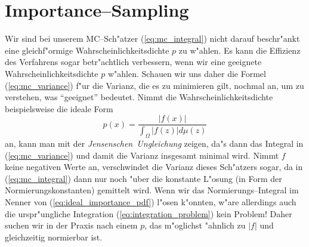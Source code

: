 	\section{Importance--Sampling}\label{subsec:importancesampling}
	Wir sind bei unserem MC--Sch"atzer (\ref{eq:mc_integral}) nicht darauf beschr"ankt eine gleich\-f"or\-mi\-ge Wahrscheinlichkeitsdichte $p$ zu w"ahlen. Es kann die Effizienz des Verfahrens sogar betr"achtlich verbessern, wenn wir eine geeignete Wahrscheinlichkeitsdichte $p$ w"ahlen. Schauen wir uns daher die Formel (\ref{eq:mc_variance}) f"ur die Varianz, die es zu minimieren gilt, nochmal an, um zu verstehen, was ``geeignet'' bedeutet. Nimmt die Wahrscheinlichkeitsdichte beispielsweise die ideale Form
	\begin{equation}
		p(x)=\frac{|f(x)|}{\int_\Omega |f(z)|d\mu(z)}
		\label{eq:ideal_importance_pdf}
	\end{equation}
	an, kann man mit der {\em Jensenschen~Ungleichung} zeigen, da"s dann das Integral in (\ref{eq:mc_variance}) und damit die Varianz insgesamt minimal wird. Nimmt $f$ keine negativen Werte an, verschwindet die Varianz dieses Sch"atzers sogar, da in (\ref{eq:mc_integral}) dann nur noch "uber die konstante L"osung (in Form der Normierungskonstanten) gemittelt wird. Wenn wir das Normierungs--Integral im Nenner von (\ref{eq:ideal_importance_pdf}) l"osen k"onnten, w"are allerdings auch die urspr"ungliche Integration (\ref{eq:integration_problem}) kein Problem! Daher suchen wir in der Praxis nach einem $p$, das m"oglichst "ahnlich zu $|f|$ und gleichzeitig normierbar ist.
	

